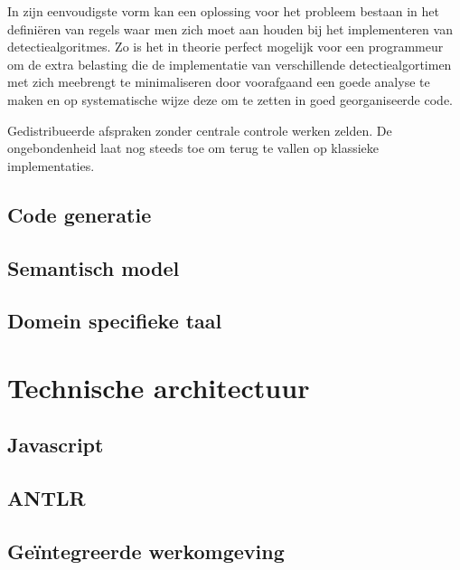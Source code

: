 In zijn eenvoudigste vorm kan een oplossing voor het probleem bestaan in het
defini\"eren van regels waar men zich moet aan houden bij het implementeren van
detectiealgoritmes. Zo is het in theorie perfect mogelijk voor een programmeur
om de extra belasting die de implementatie van verschillende detectiealgortimen
met zich meebrengt te minimaliseren door voorafgaand een goede analyse te maken
en op systematische wijze deze om te zetten in goed georganiseerde code.

Gedistribueerde afspraken zonder centrale controle werken zelden. De
ongebondenheid laat nog steeds toe om terug te vallen op klassieke
implementaties.

\subsection{Code generatie}

\TODO

\subsection{Semantisch model}

\TODO

\cite{fowler2010domain}

\subsection{Domein specifieke taal}



\section{Technische architectuur}
\label{section:techarch}

\TODO

\subsection{Javascript}

\TODO

\subsection{ANTLR}

\TODO

\subsection{Ge\"integreerde werkomgeving}

\TODO

